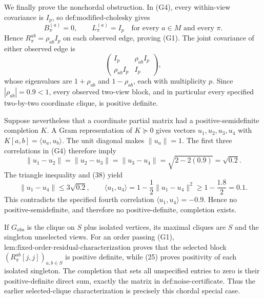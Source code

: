 We finally prove the nonchordal obstruction.  In (G4), every within-view covariance is \(I_p\), so \(\text{def:modified-cholesky}\) gives
\[
B_\pi^{(a)}=0,
\qquad L_\pi^{(a)}=I_p
\quad\text{for every }a\in M\text{ and every }\pi.
\tag{36}
\]
Hence \(R_\pi^{ab}=\rho_{ab}I_p\) on each observed edge, proving (G1).  The joint covariance of either observed edge is
\[
\begin{pmatrix}I_p&\rho_{ab}I_p\\ \rho_{ab}I_p&I_p\end{pmatrix},
\tag{37}
\]
whose eigenvalues are \(1+\rho_{ab}\) and \(1-\rho_{ab}\), each with multiplicity \(p\).  Since \(|\rho_{ab}|=0.9<1\), every observed two-view block, and in particular every specified two-by-two coordinate clique, is positive definite.

Suppose nevertheless that a coordinate partial matrix had a positive-semidefinite completion \(K\).  A Gram representation of \(K\succeq0\) gives vectors \(u_1,u_2,u_3,u_4\) with \(K[a,b]=\langle u_a,u_b\rangle\).  The unit diagonal makes \(\|u_a\|=1\).  The first three correlations in (G4) therefore imply
\[
\|u_1-u_2\|=\|u_2-u_3\|=\|u_3-u_4\|=\sqrt{2-2(0.9)}=\sqrt{0.2}.
\tag{38}
\]
The triangle inequality and (38) yield
\[
\|u_1-u_4\|\le3\sqrt{0.2},
\qquad
\langle u_1,u_4\rangle
=1-\frac12\|u_1-u_4\|^2
\ge1-\frac{1.8}{2}=0.1.
\tag{39}
\]
This contradicts the specified fourth correlation \(\langle u_1,u_4\rangle=-0.9\).  Hence no positive-semidefinite, and therefore no positive-definite, completion exists.

If \(G_{\mathrm{obs}}\) is the clique on \(S\) plus isolated vertices, its maximal cliques are \(S\) and the singleton unselected views.  For an order passing (G1), \(\text{lem:fixed-order-residual-characterization}\) proves that the selected block \((R_\pi^{ab}[j,j])_{a,b\in S}\) is positive definite, while (25) proves positivity of each isolated singleton.  The completion that sets all unspecified entries to zero is their positive-definite direct sum, exactly the matrix in \(\text{def:noise-certificate}\).  Thus the earlier selected-clique characterization is precisely this chordal special case.
